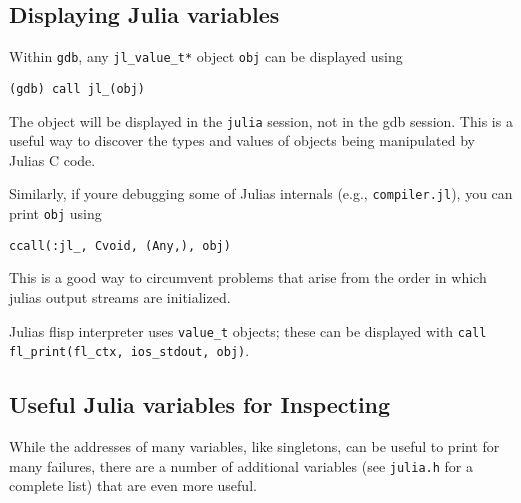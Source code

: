 \hypertarget{7470105576182008459}{}


\subsection{Displaying Julia variables}



Within \texttt{gdb}, any \texttt{jl\_value\_t*} object \texttt{obj} can be displayed using




\begin{lstlisting}
(gdb) call jl_(obj)
\end{lstlisting}



The object will be displayed in the \texttt{julia} session, not in the gdb session. This is a useful way to discover the types and values of objects being manipulated by Julia{\textquotesingle}s C code.



Similarly, if you{\textquotesingle}re debugging some of Julia{\textquotesingle}s internals (e.g., \texttt{compiler.jl}), you can print \texttt{obj} using




\begin{verbatim}
ccall(:jl_, Cvoid, (Any,), obj)
\end{verbatim}



This is a good way to circumvent problems that arise from the order in which julia{\textquotesingle}s output streams are initialized.



Julia{\textquotesingle}s flisp interpreter uses \texttt{value\_t} objects; these can be displayed with \texttt{call fl\_print(fl\_ctx, ios\_stdout, obj)}.



\hypertarget{13194055767125353293}{}


\subsection{Useful Julia variables for Inspecting}



While the addresses of many variables, like singletons, can be useful to print for many failures, there are a number of additional variables (see \texttt{julia.h} for a complete list) that are even more useful.



